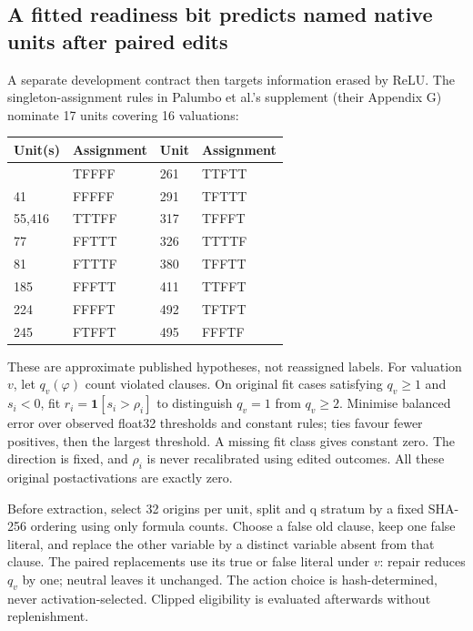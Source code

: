 \documentclass[
  british,
  11pt,
  a4paper,
]{article}
\newcounter{none} %
\begin{document}
\subsection{A fitted readiness bit predicts named native units after
paired
edits}\label{a-fitted-readiness-bit-predicts-named-native-units-after-paired-edits}

A separate development contract then targets information erased by ReLU.
The singleton-assignment rules in Palumbo et al.'s supplement (their
Appendix G) nominate 17 units covering 16 valuations:

{\def\LTcaptype{none} %
\begin{longtable}[]{@{}llll@{}}
\toprule\noalign{}
Unit(s) & Assignment & Unit & Assignment \\
\midrule\noalign{}
\endhead
\bottomrule\noalign{}
\endlastfoot
10 & TFFFF & 261 & TTFTT \\
41 & FFFFF & 291 & TFTTT \\
55,416 & TTTFF & 317 & TFFFT \\
77 & FFTTT & 326 & TTTTF \\
81 & FTTTF & 380 & TFFTT \\
185 & FFFTT & 411 & TTFFT \\
224 & FFFFT & 492 & TFTFT \\
245 & FTFFT & 495 & FFFTF \\
\end{longtable}
}

These are approximate published hypotheses, not reassigned labels. For
valuation \(v\), let \(q_v(\varphi)\) count violated clauses. On
original fit cases satisfying \(q_v\ge1\) and \(s_i<0\), fit
\(r_i=\mathbf1[s_i>\rho_i]\) to distinguish \(q_v=1\) from \(q_v\ge2\).
Minimise balanced error over observed float32 thresholds and constant
rules; ties favour fewer positives, then the largest threshold. A
missing fit class gives constant zero. The direction is fixed, and
\(\rho_i\) is never recalibrated using edited outcomes. All these
original postactivations are exactly zero.

Before extraction, select 32 origins per unit, split and q stratum by a
fixed SHA-256 ordering using only formula counts. Choose a false old
clause, keep one false literal, and replace the other variable by a
distinct variable absent from that clause. The paired replacements use
its true or false literal under \(v\): repair reduces \(q_v\) by one;
neutral leaves it unchanged. The action choice is hash-determined, never
activation-selected. Clipped eligibility is evaluated afterwards without
replenishment.
\end{document}
